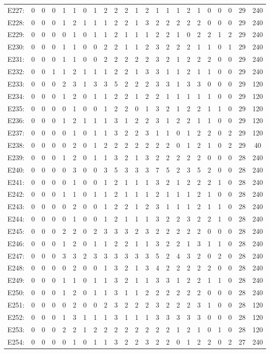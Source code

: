 \documentclass[12pt]{article}
\begin{document}
\begin{center}
\begin{tabular}{ccccccccccccccccccccc|c|c}
E227:&0&0&0&1&1&0&1&2&2&2&1&2&1&1&1&2&1&0&0&0&29&240\\
E228:&0&0&0&1&2&1&1&1&2&2&1&3&2&2&2&2&2&0&0&0&29&240\\
E229:&0&0&0&0&1&0&1&1&2&1&1&1&2&2&1&0&2&2&1&2&29&240\\
E230:&0&0&0&1&1&0&0&2&2&1&1&2&3&2&2&2&1&1&0&1&29&240\\
E231:&0&0&0&1&1&0&0&2&2&2&2&2&3&2&1&2&2&2&0&0&29&240\\
E232:&0&0&1&1&2&1&1&1&2&2&1&3&3&1&1&2&1&1&0&0&29&240\\
E233:&0&0&0&2&3&1&3&3&5&2&2&2&3&3&1&3&3&0&0&0&29&120\\
E234:&0&0&0&1&2&0&1&1&2&2&1&2&2&1&1&1&1&1&0&0&29&120\\
E235:&0&0&0&0&1&0&0&1&2&2&0&1&3&2&1&2&2&1&1&0&29&120\\
E236:&0&0&0&1&2&1&1&1&3&1&2&2&3&1&2&2&1&1&0&0&29&120\\
E237:&0&0&0&0&1&0&1&1&3&2&2&3&1&1&0&1&2&2&0&2&29&120\\
E238:&0&0&0&0&2&0&1&2&2&2&2&2&2&2&0&1&2&1&0&2&29&40\\
E239:&0&0&0&1&2&0&1&1&3&2&1&3&2&2&2&2&2&0&0&0&28&240\\
E240:&0&0&0&0&3&0&0&3&5&3&3&3&7&5&2&3&5&2&0&0&28&240\\
E241:&0&0&0&0&1&0&0&1&2&1&1&1&3&2&1&2&2&2&1&0&28&240\\
E242:&0&0&0&1&1&0&1&1&2&1&1&1&2&1&1&1&2&1&0&0&28&240\\
E243:&0&0&0&0&2&0&0&1&2&2&1&2&3&1&1&1&2&1&1&0&28&240\\
E244:&0&0&0&0&1&0&0&1&2&1&1&1&3&2&2&3&2&2&1&0&28&240\\
E245:&0&0&0&2&2&0&2&3&3&3&2&3&2&2&2&2&2&0&0&0&28&240\\
E246:&0&0&0&1&2&0&1&1&2&2&1&1&3&2&2&1&3&1&1&0&28&240\\
E247:&0&0&0&3&3&2&3&3&3&3&3&3&5&2&4&3&2&0&2&0&28&240\\
E248:&0&0&0&0&2&0&0&1&3&2&1&3&4&2&2&2&2&2&0&0&28&240\\
E249:&0&0&0&1&1&0&1&1&3&2&1&1&3&3&1&2&2&1&1&0&28&240\\
E250:&0&0&0&1&2&0&1&1&3&1&1&2&2&2&2&2&2&0&0&0&28&240\\
E251:&0&0&0&0&2&0&0&2&3&2&2&2&3&2&2&2&3&1&0&0&28&120\\
E252:&0&0&0&1&3&1&1&1&3&1&1&1&3&3&3&3&3&0&0&0&28&120\\
E253:&0&0&0&2&2&1&2&2&2&2&2&2&2&2&1&2&1&0&1&0&28&120\\
E254:&0&0&0&0&1&0&1&1&3&2&2&3&2&2&0&1&2&2&0&2&27&240\\

\end{tabular}
\end{center}
\end{document}
